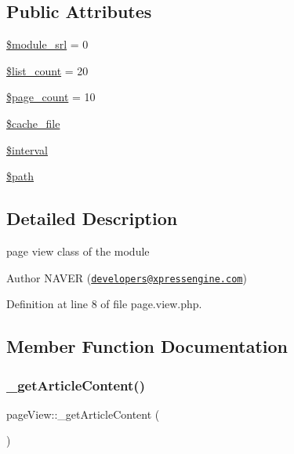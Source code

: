 \subsection*{Public Attributes}
\begin{DoxyCompactItemize}
\item 
\hyperlink{classpageView_add2f52835c01c951adb6b79453417cdf}{\$module\+\_\+srl} = 0
\item 
\hyperlink{classpageView_a7010bb0d08c9f9f9dc5a44aeaaa2bb15}{\$list\+\_\+count} = 20
\item 
\hyperlink{classpageView_a2f62b83f9128e0ccbec4a02dbb46962a}{\$page\+\_\+count} = 10
\item 
\hyperlink{classpageView_a3f961a1a2da08b16358c7541f1ba8363}{\$cache\+\_\+file}
\item 
\hyperlink{classpageView_afa343ab56bdad4ab563f9b7a6d69b95e}{\$interval}
\item 
\hyperlink{classpageView_ac629942e1cd4eacbca09412968f4c8e3}{\$path}
\end{DoxyCompactItemize}


\subsection{Detailed Description}
page view class of the module 

\begin{DoxyAuthor}{Author}
N\+A\+V\+ER (\href{mailto:developers@xpressengine.com}{\tt developers@xpressengine.\+com}) 
\end{DoxyAuthor}


Definition at line 8 of file page.\+view.\+php.



\subsection{Member Function Documentation}
\hypertarget{classpageView_a8f6d1347a1991eec2ae2b964f5fec274}{}\label{classpageView_a8f6d1347a1991eec2ae2b964f5fec274} 
\subsubsection{\texorpdfstring{\+\_\+get\+Article\+Content()}{\_getArticleContent()}}
{\footnotesize\ttfamily page\+View\+::\+\_\+get\+Article\+Content (\begin{DoxyParamCaption}{ }\end{DoxyParamCaption})}



